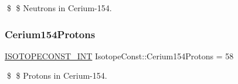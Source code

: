 \$ \$ Neutrons in Cerium-\/154. \mbox{\label{group___isotope_const-_cerium-_ce154_gaa2682eb8932ad15c5f3ddf087daa359c}} 
\subsubsection{\texorpdfstring{Cerium154\+Protons}{Cerium154Protons}}
{\footnotesize\ttfamily \mbox{\hyperlink{group___isotope_const-_macros_ga5f18360b3e99483a35c32d789e62621c}{I\+S\+O\+T\+O\+P\+E\+C\+O\+N\+S\+T\+\_\+\+I\+NT}} Isotope\+Const\+::\+Cerium154\+Protons = 58}

\$ \$ Protons in Cerium-\/154. 